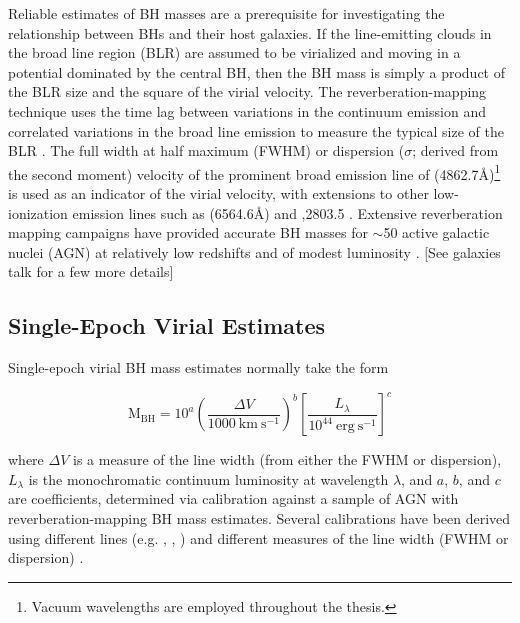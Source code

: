 Reliable estimates of BH masses are a prerequisite for investigating the relationship between BHs and their host galaxies.  
If the line-emitting clouds in the broad line region (BLR) are assumed to be virialized and moving in a potential dominated by the central BH, then the BH mass is simply a product of the BLR size and the square of the virial velocity.
The reverberation-mapping technique uses the time lag between variations in the continuum emission and correlated variations in the broad line emission to measure the typical size of the BLR \citep{peterson93,peterson14}. 
The full width at half maximum (FWHM) or dispersion ($\sigma$; derived from the second moment) velocity of the prominent broad emission line of \hb (4862.7\AA)\footnote{Vacuum wavelengths are employed throughout the thesis.} is used as an indicator of the virial velocity, with extensions to other low-ionization emission lines such as \ha (6564.6\AA) and ,2803.5 \citep[e.g.][]{vestergaard02,mclure02,wu04,kollmeier06,onken08,wang09,rafiee11}.
Extensive reverberation mapping campaigns have provided accurate BH masses for $\sim$50 active galactic nuclei (AGN) at relatively low redshifts and of modest luminosity \citep[e.g.][]{kaspi00,kaspi07,peterson04,bentz09,denney10}. 
[See galaxies talk for a few more details]

\subsection{Single-Epoch Virial Estimates}


Single-epoch virial BH mass estimates normally take the form

\begin{equation}
  \label{eq:virialmass}
  \mathrm{M_{BH}} = 10^{a} \left( \frac{\Delta V}{1000~\mathrm{km~s^{-1}}} \right)^b \left[ \frac{L_{\lambda}}{10^{44}~\mathrm{erg~s^{-1}}} \right]^c
\end{equation}

\noindent where $\Delta V$ is a measure of the line width (from either the FWHM or dispersion), $L_\lambda$ is the monochromatic continuum luminosity at wavelength $\lambda$, and $a$, $b$, and $c$ are coefficients, determined via calibration against a sample of AGN with reverberation-mapping BH mass estimates. Several calibrations have been derived using different lines (e.g. \hbns, , ) and different measures of the line width (FWHM or dispersion) \citep[e.g.][]{vestergaard02,mclure02,vestergaard06,mcgill08,wang09,rafiee11,park13}.


